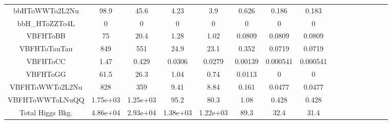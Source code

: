 \begin{table}
\begin{adjustbox}{max width=\textwidth}
\begin{tabular}{  c c c c c c c c c c c c cccc}
bbHToWWTo2L2Nu & 98.9 & 45.6 & 4.23 & 3.9 & 0.626 & 0.186 & 0.183 \\ 
bbH\_HToZZTo4L & 0 & 0 & 0 & 0 & 0 & 0 & 0 \\ 
\hline 
VBFHToBB & 75 & 20.4 & 1.28 & 1.02 & 0.0809 & 0.0809 & 0.0809 \\ 
VBFHToTauTau & 849 & 551 & 24.9 & 23.1 & 0.352 & 0.0719 & 0.0719 \\ 
VBFHToCC & 1.47 & 0.429 & 0.0306 & 0.0279 & 0.00139 & 0.000541 & 0.000541 \\ 
VBFHToGG & 61.5 & 26.3 & 1.04 & 0.74 & 0.0113 & 0 & 0 \\ 
VBFHToWWTo2L2Nu & 828 & 359 & 9.41 & 8.84 & 0.161 & 0.0477 & 0.0477 \\ 
VBFHToWWToLNuQQ & 1.75e+03 & 1.25e+03 & 95.2 & 80.3 & 1.08 & 0.428 & 0.428 \\ 
\hline 
Total Higgs Bkg. & 4.86e+04 & 2.93e+04 & 1.38e+03 & 1.22e+03 & 89.3 & 32.4 & 31.4 \\ 
\hline 
\end{tabular}
\end{adjustbox}
\end{table}

 

